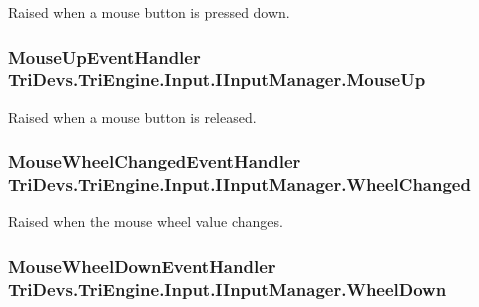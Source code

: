 Raised when a mouse button is pressed down. 

\hypertarget{interface_tri_devs_1_1_tri_engine_1_1_input_1_1_i_input_manager_a7802c9f62acf5509a7486198229c7a27}{
\subsubsection[{Mouse\-Up}]{\setlength{\rightskip}{0pt plus 5cm}Mouse\-Up\-Event\-Handler Tri\-Devs.\-Tri\-Engine.\-Input.\-I\-Input\-Manager.\-Mouse\-Up}}\label{interface_tri_devs_1_1_tri_engine_1_1_input_1_1_i_input_manager_a7802c9f62acf5509a7486198229c7a27}


Raised when a mouse button is released. 

\hypertarget{interface_tri_devs_1_1_tri_engine_1_1_input_1_1_i_input_manager_ab6fd3443048ee388a1e5624c2e7bba6d}{
\subsubsection[{Wheel\-Changed}]{\setlength{\rightskip}{0pt plus 5cm}Mouse\-Wheel\-Changed\-Event\-Handler Tri\-Devs.\-Tri\-Engine.\-Input.\-I\-Input\-Manager.\-Wheel\-Changed}}\label{interface_tri_devs_1_1_tri_engine_1_1_input_1_1_i_input_manager_ab6fd3443048ee388a1e5624c2e7bba6d}


Raised when the mouse wheel value changes. 

\hypertarget{interface_tri_devs_1_1_tri_engine_1_1_input_1_1_i_input_manager_ac5949fbd8ff7b44a239452df5e7bd0b9}{
\subsubsection[{Wheel\-Down}]{\setlength{\rightskip}{0pt plus 5cm}Mouse\-Wheel\-Down\-Event\-Handler Tri\-Devs.\-Tri\-Engine.\-Input.\-I\-Input\-Manager.\-Wheel\-Down}}\label{interface_tri_devs_1_1_tri_engine_1_1_input_1_1_i_input_manager_ac5949fbd8ff7b44a239452df5e7bd0b9}


